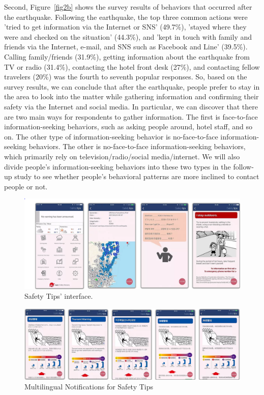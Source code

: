 Second, Figure~\ref{fig2b} shows the survey results of behaviors that occurred after the earthquake. Following the earthquake, the top three common actions were 'tried to get information via the Internet or SNS' (49.7\%), 'stayed where they were and checked on the situation' (44.3\%), and 'kept in touch with family and friends via the Internet, e-mail, and SNS such as Facebook and Line' (39.5\%). Calling family/friends (31.9\%), getting information about the earthquake from TV or radio (31.4\%), contacting the hotel front desk (27\%), and contacting fellow travelers (20\%) was the fourth to seventh popular responses. So, based on the survey results, we can conclude that after the earthquake, people prefer to stay in the area to look into the matter while gathering information and confirming their safety via the Internet and social media. In particular, we can discover that there are two main ways for respondents to gather information. The first is face-to-face information-seeking behaviors, such as asking people around, hotel staff, and so on. The other type of information-seeking behavior is no-face-to-face information-seeking behaviors. The other is no-face-to-face information-seeking behaviors, which primarily rely on television/radio/social media/internet. We will also divide people's information-seeking behaviors into these two types in the follow-up study to see whether people's behavioral patterns are more inclined to contact people or not.

\begin{figure}[h]
  \includegraphics[width=\linewidth]{Figure/Figure3.png}
  \centering
  \caption[Safety Tips' interface]{Safety Tips' interface.\protect\footnotemark }
  \label{fig3}
\end{figure}

\begin{figure}[h]
  \includegraphics[width=\linewidth]{Figure/Figure4.png}
  \centering
  \caption[Multilingual Notifications for Safety Tips]{Multilingual Notifications for Safety Tips\protect\footnotemark }
  \label{fig4}
\end{figure}

